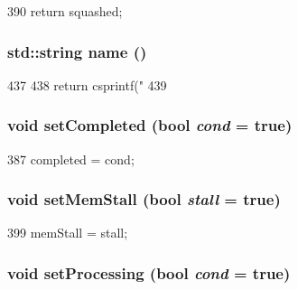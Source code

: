 \begin{DoxyCode}
390 { return squashed; }
\end{DoxyCode}
\hypertarget{classResourceRequest_af1801e31af6399bccce114ab12575168}{
\subsubsection[{name}]{\setlength{\rightskip}{0pt plus 5cm}std::string name ()}}
\label{classResourceRequest_af1801e31af6399bccce114ab12575168}



\begin{DoxyCode}
437 {
438     return csprintf("%
439 }
\end{DoxyCode}
\hypertarget{classResourceRequest_ac2df3f74e87d10a17911104bd883e133}{
\subsubsection[{setCompleted}]{\setlength{\rightskip}{0pt plus 5cm}void setCompleted (bool {\em cond} = {\ttfamily true})}}
\label{classResourceRequest_ac2df3f74e87d10a17911104bd883e133}



\begin{DoxyCode}
387 { completed = cond; }
\end{DoxyCode}
\hypertarget{classResourceRequest_a3cd636f9020a019c1b06e7aa5e460c6f}{
\subsubsection[{setMemStall}]{\setlength{\rightskip}{0pt plus 5cm}void setMemStall (bool {\em stall} = {\ttfamily true})}}
\label{classResourceRequest_a3cd636f9020a019c1b06e7aa5e460c6f}



\begin{DoxyCode}
399 { memStall = stall; }
\end{DoxyCode}
\hypertarget{classResourceRequest_a4e0df5e5228a9ecbc5192005e306b700}{
\subsubsection[{setProcessing}]{\setlength{\rightskip}{0pt plus 5cm}void setProcessing (bool {\em cond} = {\ttfamily true})}}
\label{classResourceRequest_a4e0df5e5228a9ecbc5192005e306b700}



